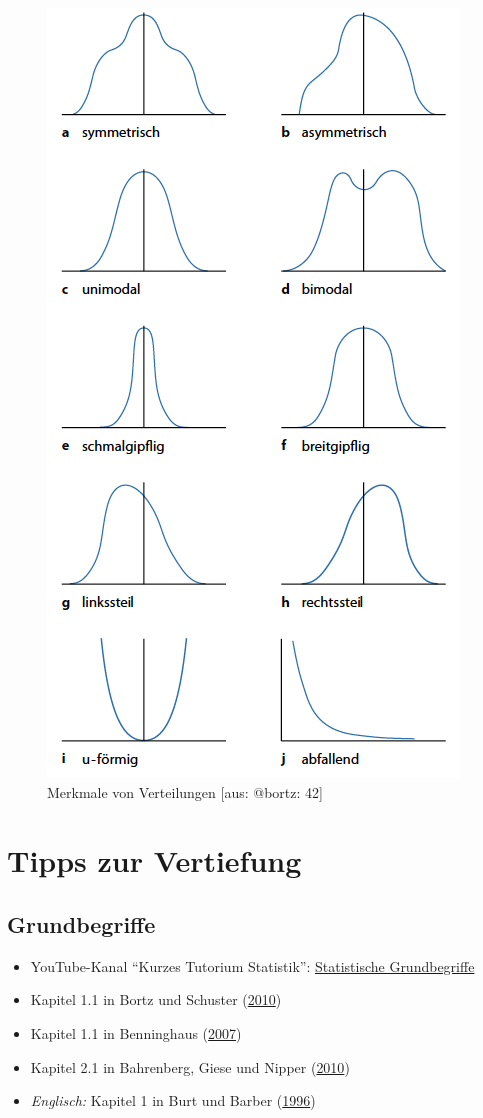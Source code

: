 \documentclass[
  11pt,
  ngerman,
  a4paper,
]{report}
\providecommand{\tightlist}{%
  \setlength{\itemsep}{0pt}\setlength{\parskip}{0pt}}
\begin{document}
\begin{figure}[!h]

{\centering \includegraphics[width=.6\linewidth]{img/shapes} 

}

\caption{Merkmale von Verteilungen [aus: @bortz: 42]}\label{fig:shapes}
\end{figure}

\hypertarget{tipps-zur-vertiefung}{%
\section*{Tipps zur Vertiefung}\label{tipps-zur-vertiefung}}

\hypertarget{grundbegriffe}{%
\subsection{Grundbegriffe}\label{grundbegriffe}}

\begin{itemize}
\tightlist
\item
  YouTube-Kanal \enquote{Kurzes Tutorium Statistik}: \href{https://www.youtube.com/watch?v=bJsBcLjke3Q}{Statistische Grundbegriffe}
\item
  Kapitel 1.1 in Bortz und Schuster (\protect\hyperlink{ref-bortz}{2010})
\item
  Kapitel 1.1 in Benninghaus (\protect\hyperlink{ref-benninghaus}{2007})
\item
  Kapitel 2.1 in Bahrenberg, Giese und Nipper (\protect\hyperlink{ref-bahrenberg}{2010})
\item
  \emph{Englisch:} Kapitel 1 in Burt und Barber (\protect\hyperlink{ref-burt}{1996})
\end{itemize}
\end{document}
